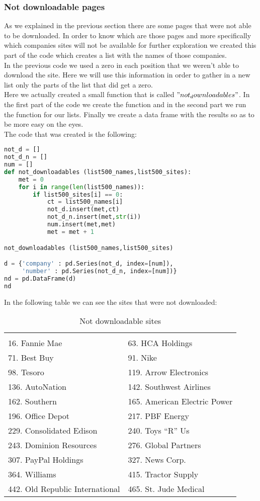 \documentclass{article}
\begin{document}
\subsubsection{Not downloadable pages}
As we explained in the previous section there are some pages that were not able to be downloaded. In order to know which are those pages and more specifically which companies sites will not be available for further exploration we created this part of the code which creates a list with the names of those companies.\\
In the previous code we used a zero in each position that we weren't able to download the site. Here we will use this information in order to gather in a new list only the parts of the list that did get a zero.\\
Here we actually created a small function that is called $"not_downloadables"$. In the first part of the code we create the function and in the second part we run the function for our lists. Finally we create a data frame with the results so as to be more easy on the eyes.\\
The code that was created is the following:
\begin{lstlisting}[language=Python]
not_d = []
not_d_n = []
num = []
def not_downloadables (list500_names,list500_sites):
    met = 0       
    for i in range(len(list500_names)):       
        if list500_sites[i] == 0:
            ct = list500_names[i]
            not_d.insert(met,ct)
            not_d_n.insert(met,str(i))
            num.insert(met,met)
            met = met + 1

not_downloadables (list500_names,list500_sites)

d = {'company' : pd.Series(not_d, index=[num]),
     'number' : pd.Series(not_d_n, index=[num])}
nd = pd.DataFrame(d)    
nd
\end{lstlisting}
In the following table we can see the sites that were not downloaded: 
\begin{table}[H]
\centering
\caption{Not downloadable sites}
\begin{tabular}{ll}
\hline
 &  \\ 
16. Fannie Mae 
& 63. HCA Holdings \\
71. Best Buy
& 91. Nike \\
98. Tesoro 
& 119. Arrow Electronics\\
136. AutoNation
& 142. Southwest Airlines \\
162. Southern 
& 165. American Electric Power\\
196. Office Depot 
& 217. PBF Energy \\
229. Consolidated Edison
& 240. Toys “R” Us \\
243. Dominion Resources 
& 276. Global Partners\\
307. PayPal Holdings 
& 327. News Corp. \\
364. Williams 
& 415. Tractor Supply\\ 
442. Old Republic International 
& 465. St. Jude Medical \\
\hline

\end{tabular}
\end{table}
\end{document}
